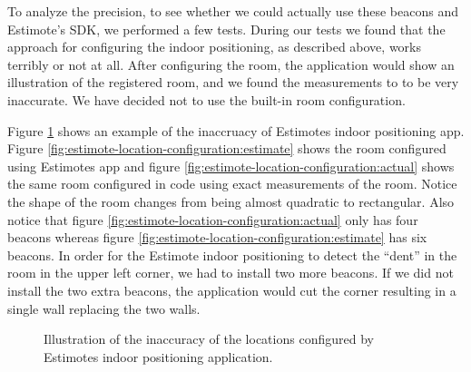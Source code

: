 To analyze the precision, 
to see whether we could actually use these beacons and Estimote's SDK, 
we performed a few tests. 
During our tests we found that the approach for configuring the indoor positioning, 
as described above, works terribly or not at all. 
After configuring the room, 
the application would show an illustration of the registered room, 
and we found the measurements to to be very inaccurate.
We have decided not to use the built-in room configuration. 

Figure \ref{fig:estimote-location-configuration} shows an example of the inaccruacy of Estimotes indoor positioning app. Figure \ref{fig:estimote-location-configuration:estimate} shows the room configured using Estimotes app and figure \ref{fig:estimote-location-configuration:actual} shows the same room configured in code using exact measurements of the room. Notice the shape of the room changes from being almost quadratic to rectangular.
Also notice that figure \ref{fig:estimote-location-configuration:actual} only has four beacons whereas figure \ref{fig:estimote-location-configuration:estimate} has six beacons. In order for the Estimote indoor positioning to detect the ``dent'' in the room in the upper left corner, we had to install two more beacons. If we did not install the two extra beacons, the application would cut the corner resulting in a single wall replacing the two walls.

\begin{figure}[!htb]%
    \centering
    \caption{Illustration of the inaccuracy of the locations configured by Estimotes indoor positioning application.}
    \label{fig:estimote-location-configuration}
\end{figure}

